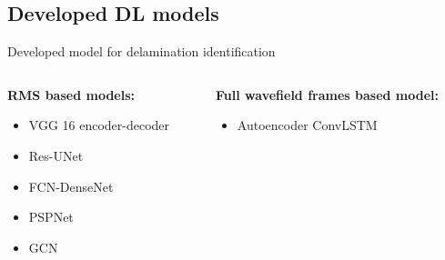 \documentclass[10pt,aspectratio=169,dvipsnames]{beamer} %
\begin{document}
		\subsection{Developed DL models}
	\begin{frame}{Developed model for delamination identification}
		\begin{columns}[T]
			\begin{column}[t]{0.45\textwidth}
				\textbf{RMS based models: }
				\medskip
				\begin{itemize}
					\item VGG 16 encoder-decoder
					\item Res-UNet					
					\item FCN-DenseNet
					\item PSPNet
					\item GCN
				\end{itemize}				
			\end{column}
			\hfill
			\begin{column}[t]{.45\textwidth}
				\textbf{Full wavefield frames based model:}
				\begin{itemize}
					\item Autoencoder ConvLSTM
				\end{itemize}				
			\end{column}
		\end{columns}
	\end{frame}	
\end{document}
